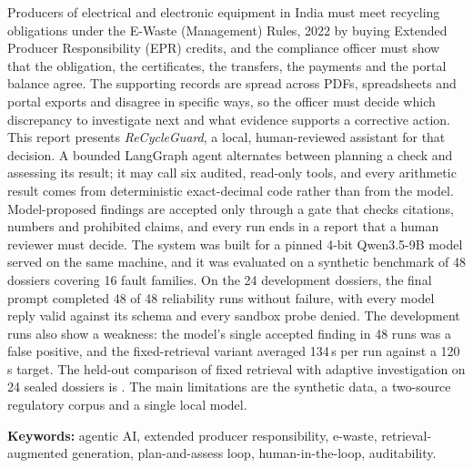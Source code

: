 Producers of electrical and electronic equipment in India must meet recycling obligations under the
E-Waste (Management) Rules, 2022 by buying Extended Producer Responsibility (EPR) credits, and the
compliance officer must show that the obligation, the certificates, the transfers, the payments and the
portal balance agree. The supporting records are spread across PDFs, spreadsheets and portal exports and
disagree in specific ways, so the officer must decide which discrepancy to investigate next and what
evidence supports a corrective action. This report presents \emph{ReCycleGuard}, a local, human-reviewed
assistant for that decision. A bounded LangGraph agent alternates between planning a check and assessing
its result; it may call six audited, read-only tools, and every arithmetic result comes from deterministic
exact-decimal code rather than from the model. Model-proposed findings are accepted only through a gate
that checks citations, numbers and prohibited claims, and every run ends in a report that a human
reviewer must decide. The system was built for a pinned 4-bit Qwen3.5-9B model served on the same machine,
and it was evaluated on a synthetic benchmark of 48 dossiers covering 16 fault families. On the 24
development dossiers, the final prompt completed 48 of 48 reliability runs without failure, with every
model reply valid against its schema and every sandbox probe denied. The development runs also show a
weakness: the model's single accepted finding in 48 runs was a false positive, and the fixed-retrieval variant averaged
134\,s per run against a 120\,s target. The held-out comparison of fixed retrieval with adaptive
investigation on 24 sealed dossiers is . The main limitations are the
synthetic data, a two-source regulatory corpus and a single local model.

\medskip
\noindent\textbf{Keywords:} agentic AI, extended producer responsibility, e-waste, retrieval-augmented
generation, plan-and-assess loop, human-in-the-loop, auditability.
